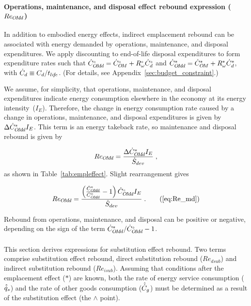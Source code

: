 \paragraph{Operations, maintenance, and disposal effect rebound expression ($Re_{O\!M\!d}$)}
\label{sec:Re_OMd}

In addition to embodied energy effects,
indirect emplacement rebound
can be associated with energy demanded by
operations, maintenance, and disposal expenditures.
We apply discounting to end-of-life disposal expenditures
to form expenditure rates such that
${}{\dot{C}}^{\scriptscriptstyle \circ}_{O\!M\!d} = {}{\dot{C}}^{\scriptscriptstyle \circ}_{O\!M} + {}{R}^{\scriptscriptstyle \circ}_\omega {}{\dot{C}}^{\scriptscriptstyle \circ}_d$
and
${\dot{C}}^*_{O\!M\!d} = {\dot{C}}^*_{O\!M} + {R}^*_\omega {\dot{C}}^*_d$,
with $\dot{C}_d \equiv C_d / t_{li\!f\!e}$.
(For details, see Appendix~\ref{sec:budget_constraint}.)

We assume, for simplicity, that operations, maintenance, and disposal expenditures
indicate energy consumption
elsewhere in the economy at its energy intensity~($I_E$).
Therefore, the change in energy consumption rate caused by a change in
operations, maintenance, and disposal expenditures
is given by $\Delta {\dot{C}}^*_{O\!M\!d} I_E$.
This term is an energy takeback rate,
so maintenance and disposal rebound is given by

\begin{equation} \label{eq:Re_md_def}
  Re_{O\!M\!d} = \frac{\Delta {\dot{C}}^*_{O\!M\!d} I_E}{\dot{S}_{dev}} \; ,
\end{equation}
%
as shown in Table~\ref{tab:empleffect}.
Slight rearrangement gives

\begin{equation}
  Re_{\omd} = \ReOMdeqn{} \; . \tag{\ref{eq:Re_md}}
\end{equation}

Rebound from operations, maintenance, and disposal can be positive or negative,
depending on the sign of the term ${\dot{C}}^*_{O\!M\!d}/{}{\dot{C}}^{\scriptscriptstyle \circ}_{O\!M\!d} - 1$.


\subsubsection{\Subeffect{}}
\label{sec:Re_sub}

This section derives expressions for substitution effect rebound.
Two terms comprise substitution effect rebound,
direct substitution rebound ($Re_{dsub}$) and
indirect substitution rebound ($Re_{isub}$).
Assuming that conditions after the emplacement effect ($*$) are known,
both the
rate of energy service consumption ($\hat{\dot{q}}_s$) and
the rate of other goods consumption ($\hat{\dot{C}}_g$)
must be determined as a result of the substitution effect
(the $\wedge$ point).

